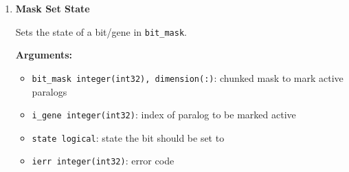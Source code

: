 \begin{enumerate}
        \textbf{Arguments:}
        \begin{itemize}
            \item \lstinline!max_subset_size integer(int32)!: maximum size that a subset must not exceed.  
                If the desired size is too large and leads to an integer overflow, \lstinline!max_subset_size! will be set to the maximum valid size.  
                Also, size will be set to number of genes in \lstinline!filtered_paralogs_mask! if larger.
            \item \lstinline!n_genes integer(int32)!: number of genes
            \item \lstinline!work_array_size integer(int32)!: the calculated needed work array size in absolute worst case scenario. Look into source for details.
            \item \lstinline!filtered_paralogs_mask integer(int32), dimension(n_mask_chunks)!: output mask with all genes disabled that did not pass the filter
            \item \lstinline!n_mask_chunks integer(int32)!: number of 32 bit chunks a mask needs to encode \lstinline!n_genes! genes
            \item \lstinline!ierr integer(int32)!: error code
        \end{itemize}

\begin{lstlisting}[caption={Work Array Size Calculation}]
call calc_work_arr_paralog_subsets_size(max_subset_size, n_genes, work_array_size, &
                                        filtered_paralogs_mask, n_mask_chunks, ierr)
\end{lstlisting}


    \item \textbf{Mask Set State}

        Sets the state of a bit/gene in \lstinline!bit_mask!.

        \textbf{Arguments:}
        \begin{itemize}
            \item \lstinline!bit_mask integer(int32), dimension(:)!: chunked mask to mark active paralogs
            \item \lstinline!i_gene integer(int32)!: index of paralog to be marked active
            \item \lstinline!state logical!: state the bit should be set to
            \item \lstinline!ierr integer(int32)!: error code
        \end{itemize}


\end{enumerate}
